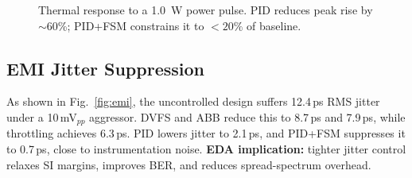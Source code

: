 \documentclass[conference]{IEEEtran}
\begin{document}
\begin{figure}[t]
\centering
{}
\caption{Thermal response to a \SI{1.0}{W} power pulse. PID reduces peak rise by $\sim$60\%; PID+FSM constrains it to $<20\%$ of baseline.}
\label{fig:thermal}
\end{figure}

\subsection{EMI Jitter Suppression}
As shown in Fig.~\ref{fig:emi}, the uncontrolled design suffers 12.4\,ps RMS jitter under a 10\,mV$_{pp}$ aggressor. DVFS and ABB reduce this to 8.7\,ps and 7.9\,ps, while throttling achieves 6.3\,ps. PID lowers jitter to 2.1\,ps, and PID+FSM suppresses it to 0.7\,ps, close to instrumentation noise.  
\textbf{EDA implication:} tighter jitter control relaxes SI margins, improves BER, and reduces spread-spectrum overhead.
\end{document}
